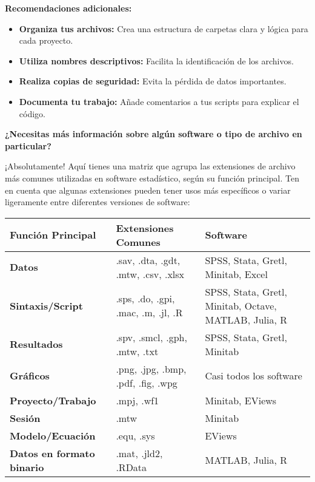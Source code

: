 \documentclass[
  jou,
  floatsintext,
  longtable,
  a4paper,
  nolmodern,
  notxfonts,
  notimes,
  colorlinks=true,linkcolor=blue,citecolor=blue,urlcolor=blue]{apa7}
\providecommand{\tightlist}{%
  \setlength{\itemsep}{0pt}\setlength{\parskip}{0pt}}
\begin{document}
\textbf{Recomendaciones adicionales:}

\begin{itemize}
\tightlist
\item
  \textbf{Organiza tus archivos:} Crea una estructura de carpetas clara
  y lógica para cada proyecto.
\item
  \textbf{Utiliza nombres descriptivos:} Facilita la identificación de
  los archivos.
\item
  \textbf{Realiza copias de seguridad:} Evita la pérdida de datos
  importantes.
\item
  \textbf{Documenta tu trabajo:} Añade comentarios a tus scripts para
  explicar el código.
\end{itemize}

\textbf{¿Necesitas más información sobre algún software o tipo de
archivo en particular?}

¡Absolutamente! Aquí tienes una matriz que agrupa las extensiones de
archivo más comunes utilizadas en software estadístico, según su función
principal. Ten en cuenta que algunas extensiones pueden tener usos más
específicos o variar ligeramente entre diferentes versiones de software:

\begin{longtable}[]{@{}
  >{\raggedright\arraybackslash}p{}
  >{\raggedright\arraybackslash}p{}
  >{\raggedright\arraybackslash}p{}@{}}
\toprule\noalign{}
\begin{minipage}[b]{\linewidth}\raggedright
Función Principal
\end{minipage} & \begin{minipage}[b]{\linewidth}\raggedright
Extensiones Comunes
\end{minipage} & \begin{minipage}[b]{\linewidth}\raggedright
Software
\end{minipage} \\
\midrule\noalign{}
\endhead
\bottomrule\noalign{}
\endlastfoot
\textbf{Datos} & .sav, .dta, .gdt, .mtw, .csv, .xlsx & SPSS, Stata,
Gretl, Minitab, Excel \\
\textbf{Sintaxis/Script} & .sps, .do, .gpi, .mac, .m, .jl, .R & SPSS,
Stata, Gretl, Minitab, Octave, MATLAB, Julia, R \\
\textbf{Resultados} & .spv, .smcl, .gph, .mtw, .txt & SPSS, Stata,
Gretl, Minitab \\
\textbf{Gráficos} & .png, .jpg, .bmp, .pdf, .fig, .wpg & Casi todos los
software \\
\textbf{Proyecto/Trabajo} & .mpj, .wf1 & Minitab, EViews \\
\textbf{Sesión} & .mtw & Minitab \\
\textbf{Modelo/Ecuación} & .equ, .sys & EViews \\
\textbf{Datos en formato binario} & .mat, .jld2, .RData & MATLAB, Julia,
R \\
\end{longtable}
\end{document}
